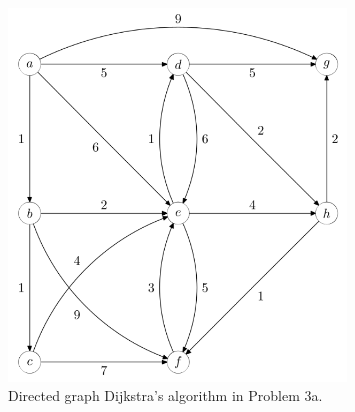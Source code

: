 \documentclass[a4paper,12pt]{article}
\begin{document}
\section[Question 2]{}
\subsection[]{}



\subsection[]{}



\subsection[]{}



\subsection[]{}



\begin{figure}[H]
    \centering
    \includegraphics[width=0.8\textwidth]{3.png}
    \caption{Directed graph Dijkstra's algorithm in Problem 3a.}
\end{figure}
\section[Question 3]{}
\subsection[]{}



\subsection[]{}



\subsection[]{}



\subsection[]{}
\end{document}
